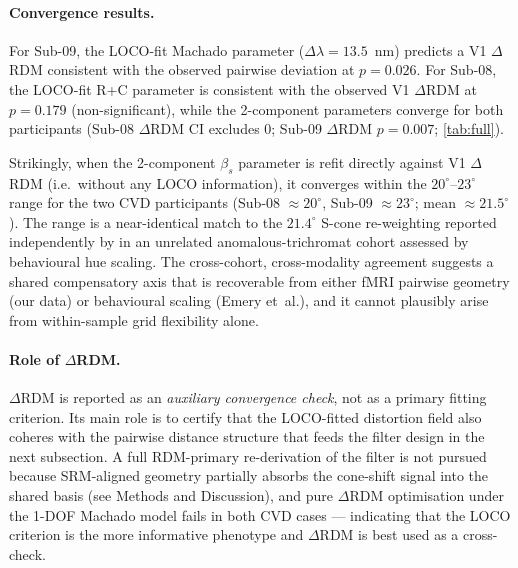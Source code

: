 \paragraph{Convergence results.}
For Sub-09, the LOCO-fit Machado parameter ($\Delta\lambda = 13.5$~nm)
predicts a V1 $\Delta$RDM consistent with the observed pairwise
deviation at $p = 0.026$. For Sub-08, the LOCO-fit R+C parameter is
consistent with the observed V1 $\Delta$RDM at $p = 0.179$
(non-significant), while the 2-component parameters converge for both
participants (Sub-08 $\Delta$RDM CI excludes 0; Sub-09
$\Delta$RDM $p = 0.007$; \cref{tab:full}).

Strikingly, when the 2-component $\beta_s$ parameter is refit directly
against V1 $\Delta$RDM (i.e.\ without any LOCO information), it
converges within the $20^\circ$--$23^\circ$ range for the two CVD
participants (Sub-08 $\approx 20^\circ$, Sub-09 $\approx 23^\circ$;
mean $\approx 21.5^\circ$). The range is a near-identical match to the
$21.4^\circ$ S-cone re-weighting reported independently by
\citet{emery2021} in an unrelated anomalous-trichromat cohort assessed
by behavioural hue scaling. The cross-cohort,
cross-modality agreement suggests a shared compensatory axis that is
recoverable from either fMRI pairwise geometry (our data) or
behavioural scaling (Emery et~al.), and it cannot plausibly arise from
within-sample grid flexibility alone.

\paragraph{Role of $\Delta$RDM.}
$\Delta$RDM is reported as an \emph{auxiliary convergence check}, not
as a primary fitting criterion. Its main role is to certify that the
LOCO-fitted distortion field also coheres with the pairwise distance
structure that feeds the filter design in the next subsection. A
full RDM-primary re-derivation of the filter is not pursued because
SRM-aligned geometry partially absorbs the cone-shift signal into the
shared basis (see Methods and Discussion), and pure $\Delta$RDM
optimisation under the 1-DOF Machado model fails in both CVD cases ---
indicating that the LOCO criterion is the more informative phenotype
and $\Delta$RDM is best used as a cross-check.

